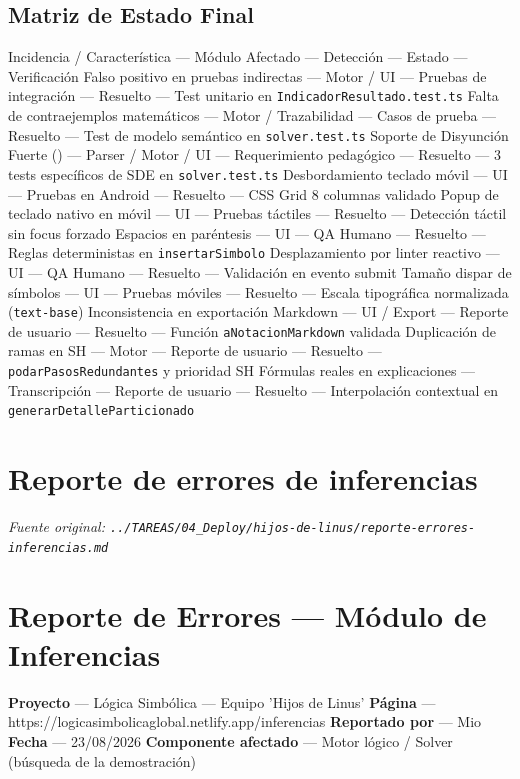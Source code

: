 \documentclass[11pt,a4paper,openany]{book}
\begin{document}
\hrulefill

\subsection{Matriz de Estado Final}

Incidencia / Característica --- Módulo Afectado --- Detección --- Estado --- Verificación
Falso positivo en pruebas indirectas --- Motor / UI --- Pruebas de integración --- Resuelto --- Test unitario en \texttt{IndicadorResultado.test.ts}
Falta de contraejemplos matemáticos --- Motor / Trazabilidad --- Casos de prueba --- Resuelto --- Test de modelo semántico en \texttt{solver.test.ts}
Soporte de Disyunción Fuerte (\texttt{}) --- Parser / Motor / UI --- Requerimiento pedagógico --- Resuelto --- 3 tests específicos de SDE en \texttt{solver.test.ts}
Desbordamiento teclado móvil --- UI --- Pruebas en Android --- Resuelto --- CSS Grid 8 columnas validado
Popup de teclado nativo en móvil --- UI --- Pruebas táctiles --- Resuelto --- Detección táctil sin focus forzado
Espacios en paréntesis --- UI --- QA Humano --- Resuelto --- Reglas deterministas en \texttt{insertarSimbolo}
Desplazamiento por linter reactivo --- UI --- QA Humano --- Resuelto --- Validación en evento submit
Tamaño dispar de símbolos --- UI --- Pruebas móviles --- Resuelto --- Escala tipográfica normalizada (\texttt{text-base})
Inconsistencia en exportación Markdown --- UI / Export --- Reporte de usuario --- Resuelto --- Función \texttt{aNotacionMarkdown} validada
Duplicación de ramas en SH --- Motor --- Reporte de usuario --- Resuelto --- \texttt{podarPasosRedundantes} y prioridad SH
Fórmulas reales en explicaciones --- Transcripción --- Reporte de usuario --- Resuelto --- Interpolación contextual en \texttt{generarDetalleParticionado}


\section{Reporte de errores de inferencias}
\textit{Fuente original: \texttt{../TAREAS/04\_Deploy/hijos-de-linus/reporte-errores-inferencias.md}}

\section{Reporte de Errores --- Módulo de Inferencias}

\textbf{Proyecto} --- Lógica Simbólica --- Equipo 'Hijos de Linus'
\textbf{Página} --- https://logicasimbolicaglobal.netlify.app/inferencias
\textbf{Reportado por} --- Mio
\textbf{Fecha} --- 23/08/2026
\textbf{Componente afectado} --- Motor lógico / Solver (búsqueda de la demostración)
\end{document}

